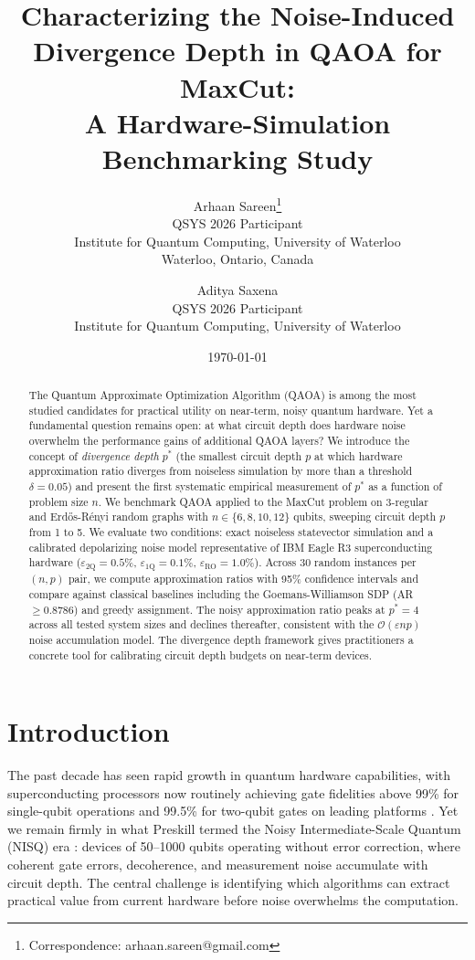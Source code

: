 \documentclass[12pt]{article}
\title{\textbf{Characterizing the Noise-Induced Divergence Depth in QAOA for MaxCut: \\
A Hardware-Simulation Benchmarking Study}}
\author{
  Arhaan Sareen\thanks{Correspondence: arhaan.sareen@gmail.com} \\
  \small QSYS 2026 Participant \\
  \small Institute for Quantum Computing, University of Waterloo \\
  \small Waterloo, Ontario, Canada
  \and
  Aditya Saxena \\
  \small QSYS 2026 Participant \\
  \small Institute for Quantum Computing, University of Waterloo
}
\date{\today}
\begin{document}
\maketitle

\begin{abstract}
The Quantum Approximate Optimization Algorithm (QAOA) is among the most studied candidates for practical utility on near-term, noisy quantum hardware. Yet a fundamental question remains open: at what circuit depth does hardware noise overwhelm the performance gains of additional QAOA layers? We introduce the concept of \emph{divergence depth} $p^*$ (the smallest circuit depth $p$ at which hardware approximation ratio diverges from noiseless simulation by more than a threshold $\delta = 0.05$) and present the first systematic empirical measurement of $p^*$ as a function of problem size $n$. We benchmark QAOA applied to the MaxCut problem on 3-regular and Erd\H{o}s-R\'enyi random graphs with $n \in \{6, 8, 10, 12\}$ qubits, sweeping circuit depth $p$ from 1 to 5. We evaluate two conditions: exact noiseless statevector simulation and a calibrated depolarizing noise model representative of IBM Eagle R3 superconducting hardware ($\varepsilon_\text{2Q} = 0.5\%$, $\varepsilon_\text{1Q} = 0.1\%$, $\varepsilon_\text{RO} = 1.0\%$). Across 30 random instances per $(n, p)$ pair, we compute approximation ratios with 95\% confidence intervals and compare against classical baselines including the Goemans-Williamson SDP (AR $\geq 0.8786$) and greedy assignment. The noisy approximation ratio peaks at $p^* = 4$ across all tested system sizes and declines thereafter, consistent with the $\mathcal{O}(\varepsilon n p)$ noise accumulation model. The divergence depth framework gives practitioners a concrete tool for calibrating circuit depth budgets on near-term devices.
\end{abstract}

\section{Introduction}

The past decade has seen rapid growth in quantum hardware capabilities, with superconducting processors now routinely achieving gate fidelities above 99\% for single-qubit operations and 99.5\% for two-qubit gates on leading platforms \cite{preskill2018nisq}. Yet we remain firmly in what Preskill termed the Noisy Intermediate-Scale Quantum (NISQ) era \cite{preskill2018nisq}: devices of 50--1000 qubits operating without error correction, where coherent gate errors, decoherence, and measurement noise accumulate with circuit depth. The central challenge is identifying which algorithms can extract practical value from current hardware before noise overwhelms the computation.
\end{document}
